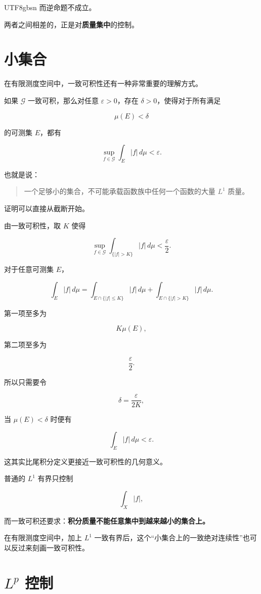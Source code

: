 \documentclass[11pt]{article}
\begin{document}
\begin{CJK*}{UTF8}{gbsn}
而逆命题不成立。

两者之间相差的，正是对\textbf{质量集中}的控制。


\section{小集合}


在有限测度空间中，一致可积性还有一种非常重要的理解方式。

如果 $\mathcal G$ 一致可积，那么对任意 $\varepsilon>0$，存在 $\delta>0$，使得对于所有满足

\[
\mu(E)<\delta
\]

的可测集 $E$，都有

\[
\sup_{f\in\mathcal G}
\int_E|f|\,d\mu
<
\varepsilon.
\]

也就是说：

\begin{quote}
一个足够小的集合，不可能承载函数族中任何一个函数的大量 $L^1$ 质量。
\end{quote}


证明可以直接从截断开始。

由一致可积性，取 $K$ 使得

\[
\sup_{f\in\mathcal G}
\int_{\{|f|>K\}}|f|\,d\mu
<
\frac{\varepsilon}{2}.
\]

对于任意可测集 $E$，

\[
\int_E|f|\,d\mu
=
\int_{E\cap\{|f|\leq K\}}|f|\,d\mu
+
\int_{E\cap\{|f|>K\}}|f|\,d\mu.
\]

第一项至多为

\[
K\mu(E),
\]

第二项至多为

\[
\frac{\varepsilon}{2}.
\]

所以只需要令

\[
\delta=\frac{\varepsilon}{2K},
\]

当 $\mu(E)<\delta$ 时便有

\[
\int_E|f|\,d\mu<\varepsilon.
\]

这其实比尾积分定义更接近一致可积性的几何意义。

普通的 $L^1$ 有界只控制

\[
\int_X|f|,
\]

而一致可积还要求：\textbf{积分质量不能任意集中到越来越小的集合上。}

在有限测度空间中，加上 $L^1$ 一致有界后，这个“小集合上的一致绝对连续性”也可以反过来刻画一致可积性。


\section{$L^p$ 控制}



\end{CJK*}
\end{document}
